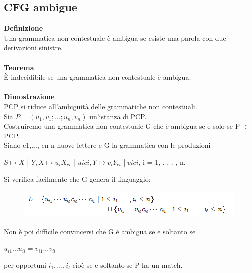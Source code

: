 \subsection{CFG ambigue}
\textbf{Definizione}\\
Una grammatica non contestuale è ambigua se esiste una parola con due derivazioni sinistre.\\\\
\textbf{Teorema}\\
È indecidibile se una grammatica non contestuale è ambigua.\\\\
\textbf{Dimostrazione}\\
PCP si riduce all’ambiguità delle grammatiche non contestuali.\\
Sia $P = (u_1,v_1; . . . ;u_n,v_n)$ un’istanza di PCP.\\
Costruiremo una grammatica non contestuale G che è ambigua se e solo se P $\in$ PCP.\\
Siano c1,..., cn n nuove lettere e G la grammatica con le produzioni\\
\begin{center}
    $ S \mapsto X$ | $Y, X \mapsto u_iX_{ci}$ | $uici, Y \mapsto v_iY_{ci}$ | $vici$, i = 1, . . . , n.
\end{center}
Si verifica facilmente che G genera il linguaggio:
\begin{figure}[htp]
    \centering
    \includegraphics[scale=0.9]{tesi_stile/img/cap7f20.png}
\end{figure}
Non è poi difficile convincersi che G è ambigua se e soltanto se
\begin{center}
    $u_{i1} ... u_{il} = v_{i1} ... v_{il}$
\end{center}
per opportuni $i_1, . . . , i_l$ cioè se e soltanto se P ha un match.